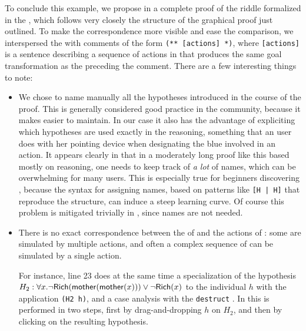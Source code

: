 To conclude this example, we propose in  a complete proof of
the riddle formalized in the  , which follows very closely the
structure of the graphical proof just outlined. To make the correspondence more
visible and ease the comparison, we interspersed the  with comments
of the form \texttt{(** [actions] *)}, where \texttt{[actions]} is a
sentence describing a sequence of actions in  that produces the same goal
transformation as the  preceding the comment. There are a few interesting
things to note:
\begin{itemize}
  \item We chose to name manually all the hypotheses introduced in the course of
  the proof. This is generally considered good practice in the  community,
  because it makes  easier to maintain. In our case it also has the
  advantage of expliciting which hypotheses are used exactly in the reasoning,
  something that an  user does with her pointing device when designating
  the blue  involved in an action. It appears clearly in
   that in a moderately long proof like this based mostly on
   reasoning, one needs to keep track of \emph{a lot} of names, which can
  be overwhelming for many users. This is especially true for beginners
  discovering , because the syntax for assigning names, based on patterns
  like \texttt{[H | H]} that reproduce the  structure, can induce a steep
  learning curve. Of course this problem is mitigated trivially in , since
  names are not needed.

  \item There is no exact correspondence between the  of  and the
  actions of : some  are simulated by multiple actions, and often a
  complex sequence of  can be simulated by a single action.
  
  For instance, line 23 does at the same time a specialization of the hypothesis
  $H_2 : \forall x. \neg \mbox{\textsf{Rich}}(\mbox{\textsf{mother}}(\mbox{\textsf{mother}}(x))) \lor \neg \mbox{\textsf{Rich}}(x)$ to the
  individual $h$ with the application \texttt{(H2 h)}, and a case analysis with
  the \texttt{destruct} . In  this is performed in two steps, first
  by drag-and-dropping $h$ on $H_2$, and then by clicking on the resulting
  hypothesis.


\end{itemize}
